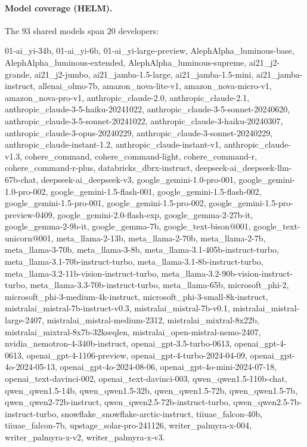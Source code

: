\documentclass{article}
\theoremstyle{definition}
\theoremstyle{remark}
\theoremstyle{plain}
\begin{document}
\paragraph{Model coverage (HELM).} The $93$ shared models span $20$ developers:
{\footnotesize\ttfamily\raggedright 01-ai\_yi-34b, 01-ai\_yi-6b, 01-ai\_yi-large-preview,
AlephAlpha\_luminous-base, AlephAlpha\_luminous-extended, AlephAlpha\_luminous-supreme,
ai21\_j2-grande, ai21\_j2-jumbo, ai21\_jamba-1.5-large, ai21\_jamba-1.5-mini,
ai21\_jamba-instruct, allenai\_olmo-7b, amazon\_nova-lite-v1, amazon\_nova-micro-v1,
amazon\_nova-pro-v1, anthropic\_claude-2.0, anthropic\_claude-2.1,
anthropic\_claude-3-5-haiku-20241022, anthropic\_claude-3-5-sonnet-20240620,
anthropic\_claude-3-5-sonnet-20241022, anthropic\_claude-3-haiku-20240307,
anthropic\_claude-3-opus-20240229, anthropic\_claude-3-sonnet-20240229,
anthropic\_claude-instant-1.2, anthropic\_claude-instant-v1, anthropic\_claude-v1.3,
cohere\_command, cohere\_command-light, cohere\_command-r, cohere\_command-r-plus,
databricks\_dbrx-instruct, deepseek-ai\_deepseek-llm-67b-chat, deepseek-ai\_deepseek-v3,
google\_gemini-1.0-pro-001, google\_gemini-1.0-pro-002, google\_gemini-1.5-flash-001,
google\_gemini-1.5-flash-002, google\_gemini-1.5-pro-001, google\_gemini-1.5-pro-002,
google\_gemini-1.5-pro-preview-0409, google\_gemini-2.0-flash-exp, google\_gemma-2-27b-it,
google\_gemma-2-9b-it, google\_gemma-7b, google\_text-bison@001, google\_text-unicorn@001,
meta\_llama-2-13b, meta\_llama-2-70b, meta\_llama-2-7b, meta\_llama-3-70b, meta\_llama-3-8b,
meta\_llama-3.1-405b-instruct-turbo, meta\_llama-3.1-70b-instruct-turbo,
meta\_llama-3.1-8b-instruct-turbo, meta\_llama-3.2-11b-vision-instruct-turbo,
meta\_llama-3.2-90b-vision-instruct-turbo, meta\_llama-3.3-70b-instruct-turbo,
meta\_llama-65b, microsoft\_phi-2, microsoft\_phi-3-medium-4k-instruct,
microsoft\_phi-3-small-8k-instruct, mistralai\_mistral-7b-instruct-v0.3,
mistralai\_mistral-7b-v0.1, mistralai\_mistral-large-2407, mistralai\_mistral-medium-2312,
mistralai\_mixtral-8x22b, mistralai\_mixtral-8x7b-32kseqlen,
mistralai\_open-mistral-nemo-2407, nvidia\_nemotron-4-340b-instruct,
openai\_gpt-3.5-turbo-0613, openai\_gpt-4-0613, openai\_gpt-4-1106-preview,
openai\_gpt-4-turbo-2024-04-09, openai\_gpt-4o-2024-05-13, openai\_gpt-4o-2024-08-06,
openai\_gpt-4o-mini-2024-07-18, openai\_text-davinci-002, openai\_text-davinci-003,
qwen\_qwen1.5-110b-chat, qwen\_qwen1.5-14b, qwen\_qwen1.5-32b, qwen\_qwen1.5-72b,
qwen\_qwen1.5-7b, qwen\_qwen2-72b-instruct, qwen\_qwen2.5-72b-instruct-turbo,
qwen\_qwen2.5-7b-instruct-turbo, snowflake\_snowflake-arctic-instruct, tiiuae\_falcon-40b,
tiiuae\_falcon-7b, upstage\_solar-pro-241126, writer\_palmyra-x-004, writer\_palmyra-x-v2,
writer\_palmyra-x-v3.\par}
\end{document}
